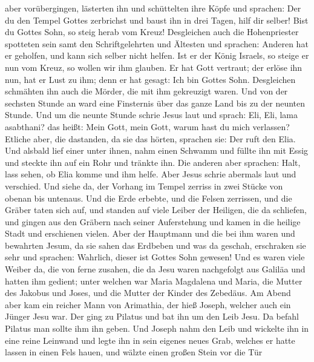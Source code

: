 aber vorübergingen, lästerten ihn und schüttelten ihre Köpfe
 und sprachen: Der du den Tempel Gottes zerbrichst und
baust ihn in drei Tagen, hilf dir selber! Bist du Gottes Sohn, so steig
herab vom Kreuz!  Desgleichen auch die Hohenpriester
spotteten sein samt den Schriftgelehrten und Ältesten und sprachen:
 Anderen hat er geholfen, und kann sich selber nicht
helfen. Ist er der König Israels, so steige er nun vom Kreuz, so wollen
wir ihm glauben.  Er hat Gott vertraut; der erlöse ihn nun,
hat er Lust zu ihm; denn er hat gesagt: Ich bin Gottes Sohn.
 Desgleichen schmähten ihn auch die Mörder, die mit ihm
gekreuzigt waren.  Und von der sechsten Stunde an ward eine
Finsternis über das ganze Land bis zu der neunten Stunde. 
Und um die neunte Stunde schrie Jesus laut und sprach: Eli, Eli, lama
asabthani? das heißt: Mein Gott, mein Gott, warum hast du mich
verlassen?  Etliche aber, die dastanden, da sie das hörten,
sprachen sie: Der ruft den Elia.  Und alsbald lief einer
unter ihnen, nahm einen Schwamm und füllte ihn mit Essig und steckte ihn
auf ein Rohr und tränkte ihn.  Die anderen aber sprachen:
Halt, lass sehen, ob Elia komme und ihm helfe.  Aber Jesus
schrie abermals laut und verschied.  Und siehe da, der
Vorhang im Tempel zerriss in zwei Stücke von obenan bis untenaus.
 Und die Erde erbebte, und die Felsen zerrissen, und die
Gräber taten sich auf, und standen auf viele Leiber der Heiligen, die da
schliefen,  und gingen aus den Gräbern nach seiner
Auferstehung und kamen in die heilige Stadt und erschienen vielen.
 Aber der Hauptmann und die bei ihm waren und bewahrten
Jesum, da sie sahen das Erdbeben und was da geschah, erschraken sie sehr
und sprachen: Wahrlich, dieser ist Gottes Sohn gewesen! 
Und es waren viele Weiber da, die von ferne zusahen, die da Jesu waren
nachgefolgt aus Galiläa und hatten ihm gedient;  unter
welchen war Maria Magdalena und Maria, die Mutter des Jakobus und Joses,
und die Mutter der Kinder des Zebedäus.  Am Abend aber kam
ein reicher Mann von Arimathia, der hieß Joseph, welcher auch ein Jünger
Jesu war.  Der ging zu Pilatus und bat ihn um den Leib
Jesu. Da befahl Pilatus man sollte ihm ihn geben.  Und
Joseph nahm den Leib und wickelte ihn in eine reine Leinwand
 und legte ihn in sein eigenes neues Grab, welches er hatte
lassen in einen Fels hauen, und wälzte einen großen Stein vor die Tür
